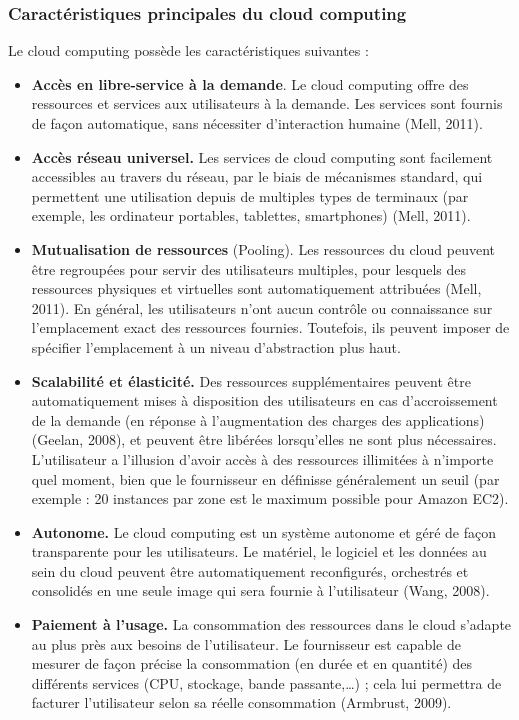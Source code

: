     \subsubsection{Caractéristiques principales du cloud computing}
    Le cloud computing  possède les caractéristiques suivantes :
    \begin{itemize}
    	\item 	\textbf{Accès en libre-service à la demande}. Le cloud computing offre des ressources et services aux utilisateurs à la demande. Les services sont fournis de façon automatique, sans nécessiter d’interaction humaine (Mell, 2011). 
    \item	\textbf{Accès réseau universel.}  Les services de cloud computing  sont facilement accessibles au travers du réseau, par le biais de mécanismes standard, qui permettent une utilisation depuis de multiples types de terminaux (par exemple, les ordinateur portables, tablettes, smartphones) (Mell, 2011). 
   \item \textbf{Mutualisation de ressources} (Pooling). Les ressources du cloud peuvent être regroupées pour servir des utilisateurs multiples, pour lesquels des ressources physiques et virtuelles sont automatiquement attribuées (Mell, 2011). En général, les utilisateurs n’ont aucun contrôle ou connaissance sur l’emplacement exact des ressources fournies. Toutefois, ils peuvent imposer de spécifier l’emplacement à un niveau d’abstraction plus haut.
   \item \textbf{Scalabilité et élasticité.} Des ressources supplémentaires peuvent être automatiquement mises à disposition des utilisateurs en cas d’accroissement de la demande (en réponse à l'augmentation des charges des applications) (Geelan, 2008), et peuvent être libérées lorsqu’elles ne sont plus nécessaires. L’utilisateur a l’illusion d’avoir accès à des ressources illimitées à n'importe quel moment, bien que le fournisseur en définisse généralement un seuil (par exemple : 20 instances par zone est le maximum possible pour Amazon EC2).
   \item \textbf{Autonome.} Le cloud computing  est un système autonome et géré de façon transparente pour les utilisateurs. Le matériel, le logiciel et les données au sein du cloud peuvent être 
    	automatiquement reconfigurés, orchestrés et consolidés en une seule image qui sera fournie à l’utilisateur (Wang, 2008).
    	\item \textbf{Paiement à l’usage.} La consommation des ressources dans le cloud s’adapte au plus près aux besoins de l’utilisateur. Le fournisseur est capable de mesurer de façon précise la consommation (en durée et en quantité) des différents services (CPU, stockage, bande passante,…) ; cela lui permettra de facturer l’utilisateur selon sa réelle consommation (Armbrust, 2009). 

\end{itemize}
